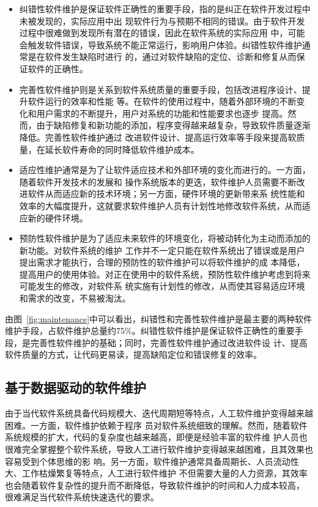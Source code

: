 \begin{itemize}
  \item 纠错性软件维护是保证软件正确性的重要手段，指的是纠正在软件开发过程中未被发现的，实际应用中出
现软件行为与预期不相同的错误。由于软件开发过程中很难做到发现所有潜在的错误，因此在软件系统的实际应用
中，可能会触发软件错误，导致系统不能正常运行，影响用户体验。纠错性软件维护通常是在软件发生缺陷时进行
的，通过对软件缺陷的定位、诊断和修复从而保证软件的正确性。
  \item 完善性软件维护则是关系到软件系统质量的重要手段，包括改进程序设计、提升软件运行的效率和性能
等。在软件的使用过程中，随着外部环境的不断变化和用户需求的不断提升，用户对系统的功能和性能要求也逐步
提高。然而，由于缺陷修复和新功能的添加，程序变得越来越复杂，导致软件质量逐渐降低。完善性软件维护通过
改进软件设计、提高运行效率等手段来提高软质量，在延长软件寿命的同时降低软件维护成本。
  \item 适应性维护通常是为了让软件适应技术和外部环境的变化而进行的。一方面，随着软件开发技术的发展和
操作系统版本的更迭，软件维护人员需要不断改进软件从而适应新的技术环境；另一方面，硬件环境的更新带来系
统性能和效率的大幅度提升，这就要求软件维护人员有计划性地修改软件系统，从而适应新的硬件环境。
  \item 预防性软件维护是为了适应未来软件的环境变化，将被动转化为主动而添加的新功能。对软件系统的维护
工作并不一定只能在软件系统出了错误或是用户提出需求才能执行，合理的预防性的软件维护可以将软件维护的成
本降低，提高用户的使用体验。对正在使用中的软件系统，预防性软件维护考虑到将来可能发生的修改，对软件系
统实施有计划性的修改，从而使其容易适应环境和需求的改变，不易被淘汰。
\end{itemize}

由图~\ref{fig:maintenance}中可以看出，纠错性和完善性软件维护是最主要的两种软件维护手段，占软件维护总量约75\%。纠错性软件维护是保证软件正确性的重要手段，是完善性软件维护的基础；同时，完善性软件维护通过改进软件设
计、提高软件质量的方式，让代码更易读，提高缺陷定位和错误修复的效率。

\subsection{基于数据驱动的软件维护}
由于当代软件系统具备代码规模大、迭代周期短等特点，人工软件维护变得越来越困难。一方面，软件维护依赖于程序
员对软件系统细致的理解。然而，随着软件系统规模的扩大，代码的复杂度也越来越高，即便是经验丰富的软件维
护人员也很难完全掌握整个软件系统，导致人工进行软件维护变得越来越困难，且其效果也容易受到个体思维的影
响。另一方面，软件维护通常具备周期长、人员流动性大、工作枯燥繁复等特点，人工进行软件维护
不但需要大量的人力资源，其效率也会随着软件复杂性的提升而不断降低，导致软件维护的时间和人力成本较高，
很难满足当代软件系统快速迭代的要求。

